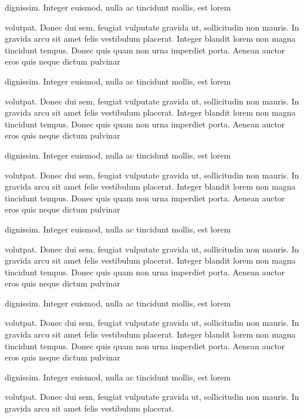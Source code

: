 {dignissim. Integer euismod, nulla ac tincidunt mollis, est lorem

volutpat. Donec dui sem, feugiat vulputate gravida ut, sollicitudin
non mauris. In gravida arcu sit amet felis vestibulum placerat.
Integer blandit lorem non magna tincidunt tempus. Donec quis quam non
urna imperdiet porta. Aenean auctor eros quis neque dictum pulvinar

dignissim. Integer euismod, nulla ac tincidunt mollis, est lorem

volutpat. Donec dui sem, feugiat vulputate gravida ut, sollicitudin
non mauris. In gravida arcu sit amet felis vestibulum placerat.
Integer blandit lorem non magna tincidunt tempus. Donec quis quam non
urna imperdiet porta. Aenean auctor eros quis neque dictum pulvinar

dignissim. Integer euismod, nulla ac tincidunt mollis, est lorem

volutpat. Donec dui sem, feugiat vulputate gravida ut, sollicitudin
non mauris. In gravida arcu sit amet felis vestibulum placerat.
Integer blandit lorem non magna tincidunt tempus. Donec quis quam non
urna imperdiet porta. Aenean auctor eros quis neque dictum pulvinar

dignissim. Integer euismod, nulla ac tincidunt mollis, est lorem

volutpat. Donec dui sem, feugiat vulputate gravida ut, sollicitudin
non mauris. In gravida arcu sit amet felis vestibulum placerat.
Integer blandit lorem non magna tincidunt tempus. Donec quis quam non
urna imperdiet porta. Aenean auctor eros quis neque dictum pulvinar

dignissim. Integer euismod, nulla ac tincidunt mollis, est lorem

volutpat. Donec dui sem, feugiat vulputate gravida ut, sollicitudin
non mauris. In gravida arcu sit amet felis vestibulum placerat.
Integer blandit lorem non magna tincidunt tempus. Donec quis quam non
urna imperdiet porta. Aenean auctor eros quis neque dictum pulvinar

dignissim. Integer euismod, nulla ac tincidunt mollis, est lorem

volutpat. Donec dui sem, feugiat vulputate gravida ut, sollicitudin
non mauris. In gravida arcu sit amet felis vestibulum placerat.
\endrule}




\bye
